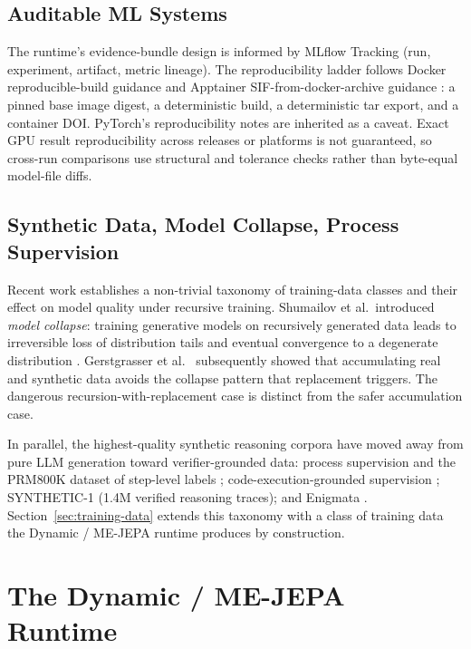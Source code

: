 \documentclass[10pt,twocolumn,letterpaper]{article}
\begin{document}
\subsection{Auditable ML Systems}

The runtime's evidence-bundle design is informed by MLflow Tracking
\cite{mlflow2024} (run, experiment, artifact, metric lineage). The
reproducibility ladder follows Docker reproducible-build guidance
\cite{docker2025reproducible} and Apptainer
SIF-from-docker-archive guidance \cite{apptainer2025buildsif}: a
pinned base image digest, a deterministic build, a deterministic
tar export, and a container DOI. PyTorch's reproducibility notes
\cite{pytorch2026reproducibility} are inherited as a caveat. Exact
GPU result reproducibility across releases or platforms is not
guaranteed, so cross-run comparisons use structural and tolerance
checks rather than byte-equal model-file diffs.

\subsection{Synthetic Data, Model Collapse, Process Supervision}

Recent work establishes a non-trivial taxonomy of training-data
classes and their effect on model quality under recursive
training. Shumailov et al.\ introduced \emph{model collapse}:
training generative models on recursively generated data leads to
irreversible loss of distribution tails and eventual convergence to
a degenerate distribution \cite{shumailov2023curse,
shumailov2024nature}. Gerstgrasser et al.\
\cite{gerstgrasser2024accumulate} subsequently showed that
accumulating real and synthetic data avoids the collapse pattern
that replacement triggers. The dangerous recursion-with-replacement
case is distinct from the safer accumulation case.

In parallel, the highest-quality synthetic reasoning corpora have
moved away from pure LLM generation toward verifier-grounded data:
process supervision and the PRM800K dataset of step-level labels
\cite{lightman2023verify}; code-execution-grounded supervision
\cite{jung2025codeexec}; SYNTHETIC-1
\cite{primeintellect2025synthetic1} (1.4M verified reasoning
traces); and Enigmata \cite{seed2025enigmata}.
Section~\ref{sec:training-data} extends this taxonomy with a class
of training data the Dynamic / ME-JEPA runtime produces by
construction.

\section{The Dynamic / ME-JEPA Runtime}
\label{sec:method}
\end{document}
